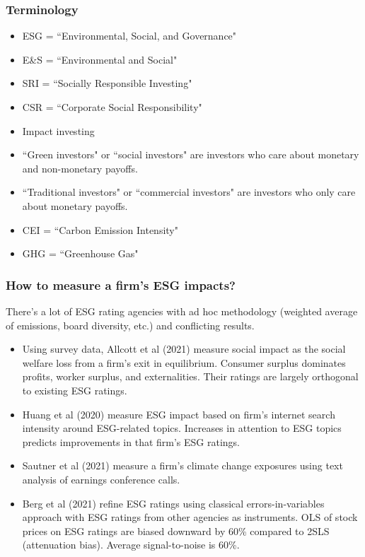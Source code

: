 \documentclass[usenames,dvipsnames, handout]{beamer}
\begin{document}
\begin{frame}[label = terminology]
\frametitle{Terminology}
\begin{itemize}
\item ESG = ``Environmental, Social, and Governance"
\item E\&S = ``Environmental and Social"
\item SRI = ``Socially Responsible Investing"
\item CSR = ``Corporate Social Responsibility"
\item Impact investing

\bigskip

\item ``Green investors" or ``social investors" are investors who care about monetary and non-monetary payoffs.
\item ``Traditional investors" or ``commercial investors" are investors who only care about monetary payoffs.

\bigskip

\item CEI = ``Carbon Emission Intensity"
\item GHG = ``Greenhouse Gas"
\end{itemize}
\hyperlink{cfcc}{}
\end{frame}



\begin{frame}[label=q_1]
\frametitle{How to measure a firm's ESG impacts?}
There's a lot of ESG rating agencies with ad hoc methodology (weighted average of emissions, board diversity, etc.) and conflicting results.
\bigskip
\begin{itemize}[<+->]
\item Using survey data, Allcott et al (2021) measure social impact as the social welfare loss from a firm's exit in equilibrium. Consumer surplus dominates profits, worker surplus, and externalities. Their ratings are largely orthogonal to existing ESG ratings.
\bigskip
\item Huang et al (2020) measure ESG impact based on firm's internet search intensity around ESG-related topics. Increases in attention to ESG topics predicts
improvements in that firm's ESG ratings.
\bigskip
\item Sautner et al (2021) measure a firm's climate change exposures using text analysis of earnings conference calls.
\bigskip
\item Berg et al (2021) refine ESG ratings using classical errors-in-variables approach with ESG ratings from other agencies as instruments. OLS of stock prices on ESG ratings are biased downward by 60\% compared to 2SLS (attenuation bias). Average signal-to-noise is 60\%.
\end{itemize}
\end{frame}
\end{document}
